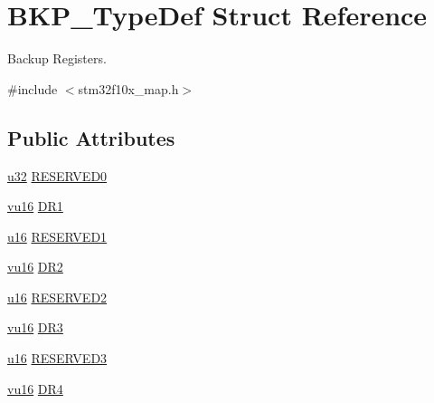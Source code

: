 \hypertarget{struct_b_k_p___type_def}{}\section{B\+K\+P\+\_\+\+Type\+Def Struct Reference}
\label{struct_b_k_p___type_def}


Backup Registers.  




{\ttfamily \#include $<$stm32f10x\+\_\+map.\+h$>$}

\subsection*{Public Attributes}
\begin{DoxyCompactItemize}
\item 
\hyperlink{agilefox_2library_2inc_2stm32f10x__type_8h_a2caf5cd7bcdbe1eefa727f44ffb10bac}{u32} \hyperlink{struct_b_k_p___type_def_a757208bc8655f7a5b5411732ac20fe25}{R\+E\+S\+E\+R\+V\+E\+D0}
\item 
\hyperlink{agilefox_2library_2inc_2stm32f10x__type_8h_a9e9f2c67df0bbcd2dd7753693525ee07}{vu16} \hyperlink{struct_b_k_p___type_def_a7f5659ec729bb18121ce846e56f5cdfb}{D\+R1}
\item 
\hyperlink{agilefox_2library_2inc_2stm32f10x__type_8h_a9e6c91d77e24643b888dbd1a1a590054}{u16} \hyperlink{struct_b_k_p___type_def_a3a2f72c5049382c7d1eda341806e8201}{R\+E\+S\+E\+R\+V\+E\+D1}
\item 
\hyperlink{agilefox_2library_2inc_2stm32f10x__type_8h_a9e9f2c67df0bbcd2dd7753693525ee07}{vu16} \hyperlink{struct_b_k_p___type_def_ab4635ed2efafd6f21c7f3a4387ea7182}{D\+R2}
\item 
\hyperlink{agilefox_2library_2inc_2stm32f10x__type_8h_a9e6c91d77e24643b888dbd1a1a590054}{u16} \hyperlink{struct_b_k_p___type_def_aae3bee55b08bd8f217f2acbd5500eead}{R\+E\+S\+E\+R\+V\+E\+D2}
\item 
\hyperlink{agilefox_2library_2inc_2stm32f10x__type_8h_a9e9f2c67df0bbcd2dd7753693525ee07}{vu16} \hyperlink{struct_b_k_p___type_def_a1579dd5ba839e5f73fba0f31ff9cc8d7}{D\+R3}
\item 
\hyperlink{agilefox_2library_2inc_2stm32f10x__type_8h_a9e6c91d77e24643b888dbd1a1a590054}{u16} \hyperlink{struct_b_k_p___type_def_a1a613f945c8d1ccd2fe6daf3a24da700}{R\+E\+S\+E\+R\+V\+E\+D3}
\item 
\hyperlink{agilefox_2library_2inc_2stm32f10x__type_8h_a9e9f2c67df0bbcd2dd7753693525ee07}{vu16} \hyperlink{struct_b_k_p___type_def_ab54fd9674a9f7c7cc5df417a282de140}{D\+R4}

\end{DoxyCompactItemize}
